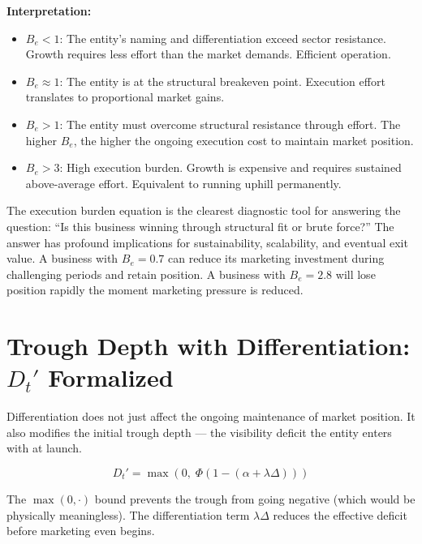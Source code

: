 \documentclass[12pt, openany]{book}
\theoremstyle{thmstyle}
\theoremstyle{defstyle}
\begin{document}
\textbf{Interpretation:}
\begin{itemize}[leftmargin=1.5em]
  \item $B_e < 1$: The entity's naming and differentiation exceed sector resistance. Growth requires less effort than the market demands. Efficient operation.
  \item $B_e \approx 1$: The entity is at the structural breakeven point. Execution effort translates to proportional market gains.
  \item $B_e > 1$: The entity must overcome structural resistance through effort. The higher $B_e$, the higher the ongoing execution cost to maintain market position.
  \item $B_e > 3$: High execution burden. Growth is expensive and requires sustained above-average effort. Equivalent to running uphill permanently.
\end{itemize}

The execution burden equation is the clearest diagnostic tool for answering the question: ``Is this business winning through structural fit or brute force?'' The answer has profound implications for sustainability, scalability, and eventual exit value. A business with $B_e = 0.7$ can reduce its marketing investment during challenging periods and retain position. A business with $B_e = 2.8$ will lose position rapidly the moment marketing pressure is reduced.

\section{Trough Depth with Differentiation: $D_t'$ Formalized}

Differentiation does not just affect the ongoing maintenance of market position. It also modifies the initial trough depth --- the visibility deficit the entity enters with at launch.

\begin{equation}
D_t' = \max\left(0,\; \Phi\left(1 - (\alpha + \lambda\Delta)\right)\right)
\label{eq:adjusted_trough}
\end{equation}

The $\max(0, \cdot)$ bound prevents the trough from going negative (which would be physically meaningless). The differentiation term $\lambda\Delta$ reduces the effective deficit before marketing even begins.
\end{document}
